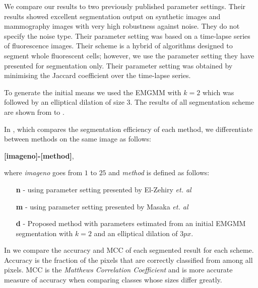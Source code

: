 \documentclass[10pt, journal, letterpaper, onecolumn, draftcls]{IEEEtran}
\begin{document}
We compare our results to two previously published parameter settings.
Their results showed excellent segmentation output on synthetic images and mammography images with very high robustness against noise. They do not specify the noise type.
Their parameter setting was based on a time-lapse series of fluorescence images. Their scheme is a hybrid of algorithms designed to segment whole fluorescent cells; however, we use the parameter setting they have presented for segmentation only. Their parameter setting was obtained by minimising the Jaccard coefficient over the time-lapse series.

To generate the initial means we used the EMGMM with $k=2$ which was followed by an elliptical dilation of size $3$.
The results of all segmentation scheme are shown from  to .

In , which compares the segmentation efficiency of each method, we differentiate between methods on the same image as follows:

\textbf{[imageno]-[method]}, 

where \textit{imageno} goes from $1$ to $25$ and \textit{method} is defined as follows:
\begin{enumerate}
	\item [\textbf{n}] - using parameter setting presented by El-Zehiry \textit{et. al} %
	\item [\textbf{m}] - using parameter setting presented by Masaka \textit{et. al} %
	\item [\textbf{d}] - Proposed method with parameters estimated from an initial EMGMM segmentation with $k=2$ and an elliptical dilation of $3px$.
\end{enumerate}

In  we compare the accuracy and MCC of each segmented result for each scheme. Accuracy is the fraction of the pixels that are correctly classified from among all pixels. MCC is the \textit{Matthews Correlation Coefficient} and is more accurate measure of accuracy when comparing classes whose sizes differ greatly. 
\end{document}
